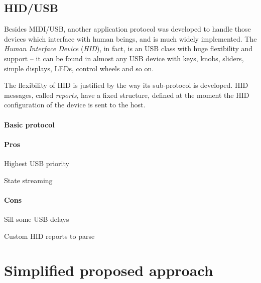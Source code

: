 \documentclass[a4paper,10pt]{article}
\begin{document}
\begin{multicols}{2}
\subsection{HID/USB}

Besides MIDI/USB, another application protocol was developed to handle those
devices which interface with human beings, and is much widely implemented.
The \emph{Human Interface Device} (\emph{HID}), in fact, is an USB class
with huge flexibility and support -- it can be found in almost any USB device
with keys, knobs, sliders, simple displays, LEDs, control wheels and so on.

The flexibility of HID is justified by the way its sub-protocol is developed.
HID messages, called \emph{reports}, have a fixed structure, defined at the
moment the HID configuration of the device is sent to the host.

\TODO


\paragraph{Basic protocol}
\TODO


\paragraph{Pros}
\begin{itemize*}
	\item Highest USB priority
	\item State streaming
	\item \TODO
\end{itemize*}


\paragraph{Cons}
\begin{itemize*}
	\item Sill some USB delays
	\item Custom HID reports to parse
	\item \TODO
\end{itemize*}


\section{Simplified proposed approach}
\label{sec:simplified_approach}


\end{multicols}
\end{document}
